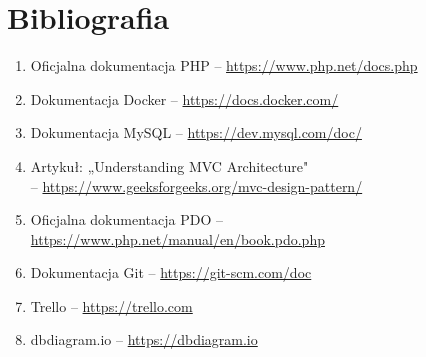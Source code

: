 \documentclass[12pt,a4paper]{article}
\begin{document}
\newpage
\section{Bibliografia}
\begin{enumerate}
	\item Oficjalna dokumentacja PHP -- \url{https://www.php.net/docs.php}
	\item Dokumentacja Docker -- \url{https://docs.docker.com/}
	\item Dokumentacja MySQL -- \url{https://dev.mysql.com/doc/}
	\item Artykuł: „Understanding MVC Architecture" \\ -- \url{https://www.geeksforgeeks.org/mvc-design-pattern/}
	\item Oficjalna dokumentacja PDO -- \url{https://www.php.net/manual/en/book.pdo.php}
	\item Dokumentacja Git -- \url{https://git-scm.com/doc}
	\item Trello -- \url{https://trello.com}
	\item dbdiagram.io -- \url{https://dbdiagram.io}
\end{enumerate}
	
\end{document}
